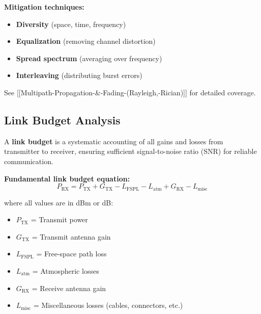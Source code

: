 \begin{center}
\end{center}

\textbf{Mitigation techniques:}
\begin{itemize}
\item \textbf{Diversity} (space, time, frequency)
\item \textbf{Equalization} (removing channel distortion)
\item \textbf{Spread spectrum} (averaging over frequency)
\item \textbf{Interleaving} (distributing burst errors)
\end{itemize}

See {[}{[}Multipath-Propagation-\&-Fading-(Rayleigh,-Rician){]}{]} for detailed coverage.

\subsection{Link Budget Analysis}

A \textbf{link budget} is a systematic accounting of all gains and losses from transmitter to receiver, ensuring sufficient signal-to-noise ratio (SNR) for reliable communication.

\textbf{Fundamental link budget equation:}
\begin{equation}
P_{\text{RX}} = P_{\text{TX}} + G_{\text{TX}} - L_{\text{FSPL}} - L_{\text{atm}} + G_{\text{RX}} - L_{\text{misc}}
\label{eq:link_budget}
\end{equation}

where all values are in dBm or dB:
\begin{itemize}
\item $P_{\text{TX}}$ = Transmit power
\item $G_{\text{TX}}$ = Transmit antenna gain
\item $L_{\text{FSPL}}$ = Free-space path loss
\item $L_{\text{atm}}$ = Atmospheric losses
\item $G_{\text{RX}}$ = Receive antenna gain
\item $L_{\text{misc}}$ = Miscellaneous losses (cables, connectors, etc.)
\end{itemize}

